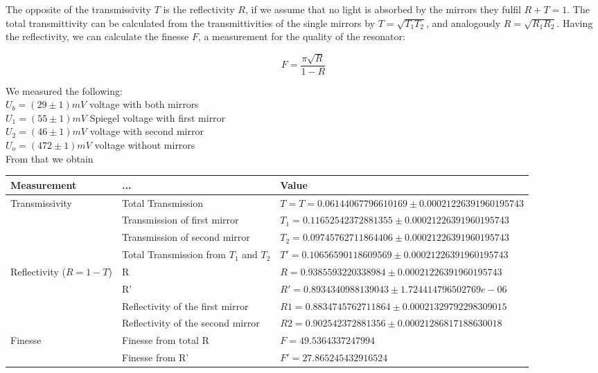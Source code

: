 \documentclass{article}
\begin{document}
The opposite of the transmissivity $T$ is the reflectivity $R$, if we assume that no light is absorbed by the mirrors they fulfil $R+T=1$. The total transmittivity can be calculated from the transmittivities of the single mirrors by $T = \sqrt{T_{1}T_{2}}$, and analogously  $R = \sqrt{R_{1}R_{2}}$. Having the reflectivity, we can calculate the finesse $F$, a measurement for the quality of the resonator:

\begin{equation}
F= \frac{\pi\sqrt{R}}{1-R}
\end{equation}

We measured the following:\\
$U_b = (29\pm1)mV$ voltage with both mirrors\\
$U_1 = (55\pm1)mV$  Spiegel voltage with first mirror\\
$U_2 = (46\pm1)mV$  voltage with second mirror\\
$U_o = (472\pm1)mV$ voltage without mirrors\\

From that we obtain \\

\begin{table}[H]
\centering
\begin{tabular}{|p{2cm}|p{3cm}|p{6cm}|}
\hline
Measurement & ... & Value \\
\hline
\multirow{1}{*}{Transmissivity}
        &Total Transmission & $T= T= 0.06144067796610169 \pm 0.00021226391960195743$\\
        &Transmission of first mirror & $T_{1}= 0.11652542372881355 \pm 0.00021226391960195743$\\
        &Transmission of second mirror & $T_{2}= 0.09745762711864406 \pm 0.00021226391960195743$\\
        &Total Transmission from $T_{1}$ and $T_{2}$& $T' = 0.10656590118609569 \pm 0.00021226391960195743$\\
\hline
\multirow{1}{*}{Reflectivity ($R=1-T$)}
        & R  &$R=  0.9385593220338984 \pm 0.00021226391960195743$\\
        & R' &$R'=  0.8934340988139043 \pm 1.724414796502769e-06$\\
        & Reflectivity of the first mirror &$ R1=  0.8834745762711864 \pm 0.00021329792298309015$\\
        & Reflectivity of the second mirror  &$R2=  0.902542372881356 \pm 0.00021286817188630018$\\
\hline
\multirow{1}{*}{Finesse}
        & Finesse from total R & $F= 49.5364337247994$\\
        & Finesse from R' & $F' = 27.865245432916524$ \\
\hline
\end{tabular}
\end{table}
\end{document}
